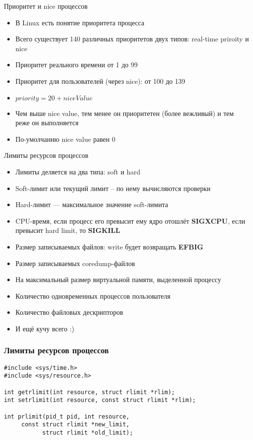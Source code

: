 \documentclass[10pt,pdf,hyperref={unicode}]{beamer}
\begin{document}
\begin{frame}{Приоритет и nice процессов}
\begin{itemize}
    \item В Linux есть понятие приоритета процесса
    \item Всего существует 140 различных приоритетов двух типов: real-time priroity и nice
    \item Приоритет реального времени от 1 до 99
    \item Приоритет для пользователей (через nice): от 100 до 139
    \item $priority = 20 + niceValue$
    \item Чем выше nice value, тем менее он приоритетен (более вежливый) и тем реже он выполняется
    \item По-умолчанию nice value равен 0
\end{itemize}
\end{frame}

\begin{frame}{Лимиты ресурсов процессов}
\begin{itemize}
    \item Лимиты деляется на два типа: soft и hard
    \item Soft-лимит или текущий лимит -- по нему вычисляются проверки
    \item Hard-лимит — максимальное значение soft-лимита
    \item CPU-время, если процесс его превысит ему ядро отошлёт \textbf{SIGXCPU}, если превысит hard limit, то \textbf{SIGKILL}
    \item Размер записываемых файлов: write будет возвращать \textbf{EFBIG}
    \item Размер записываемых coredump-файлов
    \item На максимальный размер виртуальной памяти, выделенной процессу
    \item Количество одновременных процессов пользователя
    \item Количество файловых дескрипторов
    \item И ещё кучу всего :)
\end{itemize}
\end{frame}

\begin{frame}[fragile]
\frametitle{Лимиты ресурсов процессов}
\begin{center}
\begin{minipage}{0.95\textwidth}
\begin{verbatim}
#include <sys/time.h>
#include <sys/resource.h>

int getrlimit(int resource, struct rlimit *rlim);
int setrlimit(int resource, const struct rlimit *rlim);

int prlimit(pid_t pid, int resource,
     const struct rlimit *new_limit,
           struct rlimit *old_limit);
\end{verbatim}
\end{minipage}
\end{center}
\end{frame}
\end{document}
